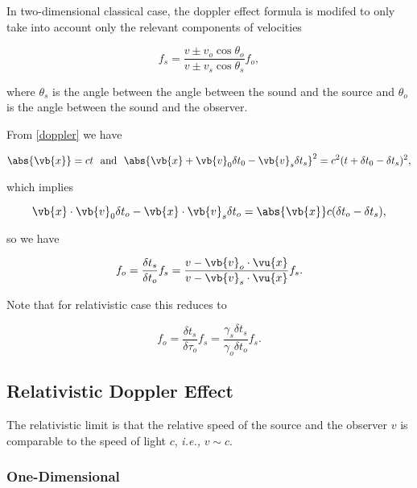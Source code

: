 \documentclass[english,a4paper,12pt]{report}
\begin{document}
In two-dimensional classical case, the doppler effect formula is modifed to only take into account only the relevant components of velocities

\begin{equation}
    f_{s} = \frac{v \pm v_{o} \cos \theta _{o}  }{v \pm v_{s} \cos \theta _{s} } f_{o} ,  
\end{equation}

where \(\theta _{s} \) is the angle between the angle between the sound and the source and \(\theta _{o} \) is the angle between the sound and the observer. 


From \cref{doppler} we have 

\begin{equation}
    \abs{\vb{x} } = ct ~\text { and }~ \abs{\vb{x} + \vb{v} _{0}\delta t_0 - \vb{v} _{s} \delta t_{s}   }^2 = c^2(t+\delta t_0 -\delta t_{s} )^2,  
\end{equation}

which implies 

\begin{equation}
    \vb{x} \cdot \vb{v} _{0}\delta t_o - \vb{x} \cdot \vb{v} _{s} \delta t_{o} = \abs{\vb{x} } c(\delta t_o - \delta t_{s} ),    
\end{equation}

so we have 

\begin{equation}
    f_{o} = \frac{\delta t_s }{\delta t_{o} } f_{s} = \frac{v-\vb{v} _{o} \cdot \vu{x}   }{v-\vb{v} _{s}\cdot \vu{x}  } f_{s}.  
\end{equation}

Note that for relativistic case this reduces to 

\begin{equation}
    f_{o} = \frac{\delta t_{s} }{\delta \tau _{o} } f_{s} = \frac{\gamma _{s}\delta t_{s}  }{\gamma _{o} \delta t_{o}  } f_{s}.    
\end{equation}

\subsection{Relativistic Doppler Effect}

The relativistic limit is that the relative speed of the source and the observer \(v\) is comparable to the speed of light \(c\), \textit{i.e.,} \(v \sim  c\). 

\subsubsection{One-Dimensional}
\end{document}
